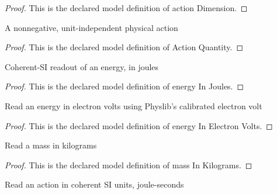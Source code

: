 \begin{proof}
  This is the declared model definition of action Dimension.
\end{proof}
\begin{definition}
  \label{def:physics:phyx-mini-0570:phyxminiproblems-problemphyxmini0570-actionquantity}
  A nonnegative, unit-independent physical action
\end{definition}
\begin{proof}
  This is the declared model definition of Action Quantity.
\end{proof}
\begin{definition}
  \label{def:physics:phyx-mini-0570:phyxminiproblems-problemphyxmini0570-energyinjoules}
  Coherent-SI readout of an energy, in joules
\end{definition}
\begin{proof}
  This is the declared model definition of energy In Joules.
\end{proof}
\begin{definition}
  \label{def:physics:phyx-mini-0570:phyxminiproblems-problemphyxmini0570-energyinelectronvolts}
  Read an energy in electron volts using Physlib's calibrated electron volt
\end{definition}
\begin{proof}
  This is the declared model definition of energy In Electron Volts.
\end{proof}
\begin{definition}
  \label{def:physics:phyx-mini-0570:phyxminiproblems-problemphyxmini0570-massinkilograms}
  Read a mass in kilograms
\end{definition}
\begin{proof}
  This is the declared model definition of mass In Kilograms.
\end{proof}
\begin{definition}
  \label{def:physics:phyx-mini-0570:phyxminiproblems-problemphyxmini0570-actioninjouleseconds}
  Read an action in coherent SI units, joule-seconds
\end{definition}

